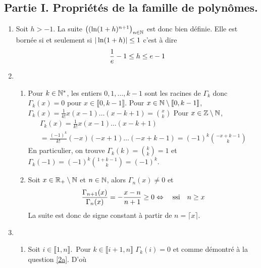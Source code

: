 \subsection*{Partie I. Propriétés de la famille de polynômes.}
\begin{enumerate}
\item Soit  $h>-1$. La suite  $\left((\ln(1+h)^{n+1}\right) _{n\in \mathbb{N}}$ est donc bien définie. Elle est bornée si et seulement si $|\ln(1+h)|\leq 1$ c'est à dire
\begin{displaymath}
\frac 1e-1\leq h\leq e-1 
\end{displaymath}

\item 
\begin{enumerate}
\item \label{2a} Pour $k\in\mathbb{N}^*$, les entiers $0, 1, \dots, k-1$ sont les racines de $\Gamma_k$ donc $\Gamma_k(x)=0$ pour $x\in \llbracket 0, k-1\rrbracket$. \newline
Pour $x\in \mathbb{N} \setminus \llbracket 0, k-1\rrbracket$, $\Gamma_k(x)=\frac{1}{k!}x(x-1)\dots(x-k+1)=\binom{x}{k}$\newline
Pour $x\in\mathbb{Z}\setminus \mathbb{N}$,
\begin{multline*}
\Gamma_k(x)=\frac{1}{k!}x(x-1)\dots(x-k+1)\\ =\frac{(-1)^k}{k!}(-x)(-x+1)\dots(-x+k-1)
=(-1)^k \binom{-x+k-1}{k} 
\end{multline*}
En particulier, on trouve $\Gamma_k(k)=\binom{k}{k}=1$ et $\Gamma_k(-1)=(-1)^k\binom{1+k-1}{k}=(-1)^k$.
\item Soit $x\in\mathbb{R}_+\setminus\mathbb{N}$ et $n\in\mathbb{N}$, alors $\Gamma_n(x)\neq 0$ et
\begin{displaymath}
 \frac{\Gamma_{n+1}(x)}{\Gamma_n(x)}=-\frac{x-n}{n+1}\geq 0 \Leftrightarrow\quad \text{ssi}\quad n\geq x
\end{displaymath}
La suite est donc de signe constant à partir de $n=\lceil x \rceil$.
\end{enumerate}
\item
\begin{enumerate}
\item Soit $i\in\llbracket 1, n\rrbracket$.\
 Pour $k\in\llbracket i+1, n\rrbracket$ $\Gamma_k(i)=0$ et comme démontré à la question \ref{2a}. D'où


\end{enumerate}
\end{enumerate}
